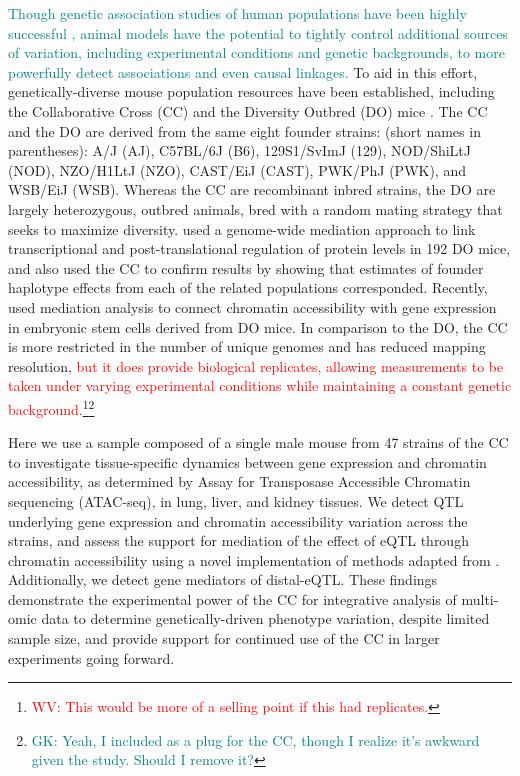 \documentclass[9pt,twocolumn,twoside]{gsajnl}
\newcommand{\WV}[2]{\textcolor{red}{#1\footnote{\textcolor{red}{WV: #2}}}}
\newcommand{\GK}[2]{\textcolor{teal}{#1\footnote{\textcolor{teal}{GK: #2}}}}
\newcommand{\GKinline}[1]{\textcolor{teal}{#1}}
\begin{document}
\GKinline{Though genetic association studies of human populations have been highly successful \citep{Visscher2017}, animal models have the potential to tightly control additional sources of variation, including experimental conditions and genetic backgrounds, to more powerfully detect associations and even causal linkages.}
To aid in this effort, genetically-diverse mouse population resources have been established, including the Collaborative Cross (CC) \citep{Churchill2004,Hall2012,Srivastava2017} and the Diversity Outbred (DO) mice \citep{Churchill2012}. The CC and the DO are derived from the same eight founder strains: (short names in parentheses): A/J (AJ), C57BL/6J (B6), 129S1/SvImJ (129), NOD/ShiLtJ (NOD), NZO/H1LtJ (NZO), CAST/EiJ (CAST), PWK/PhJ (PWK), and WSB/EiJ (WSB). Whereas the CC are recombinant inbred strains, the DO are largely heterozygous, outbred animals, bred with a random mating strategy that seeks to maximize diversity. \cite{Chick2016} used a genome-wide mediation approach to link transcriptional and post-translational regulation of protein levels in 192 DO mice, and also used the CC to confirm results by showing that estimates of founder haplotype effects from each of the related populations corresponded. Recently, \cite{Skelly2019} used mediation analysis to connect chromatin accessibility with gene expression in embryonic stem cells derived from DO mice. In comparison to the DO, the CC is more restricted in the number of unique genomes and has reduced mapping resolution, \WV{but it does provide biological replicates, allowing measurements to be taken under varying experimental conditions while maintaining a constant genetic background.}{This would be more of a selling point if this had replicates.}\GK{}{Yeah, I included as a plug for the CC, though I realize it's awkward given the study. Should I remove it?}

Here we use a sample composed of a single male mouse from 47 strains of the CC to investigate tissue-specific dynamics between gene expression and  chromatin accessibility, as determined by Assay for Transposase Accessible Chromatin sequencing (ATAC-seq), in lung, liver, and kidney tissues. We detect QTL underlying gene expression and chromatin accessibility variation across the strains, and assess the support for mediation of the effect of eQTL through chromatin accessibility using a novel implementation of methods adapted from \cite{Chick2016}. Additionally, we detect gene mediators of distal-eQTL. 
These findings demonstrate the experimental power of the CC for integrative analysis of multi-omic data to determine genetically-driven phenotype variation, despite limited sample size, and provide support for continued use of the CC in larger experiments going forward.
\end{document}
